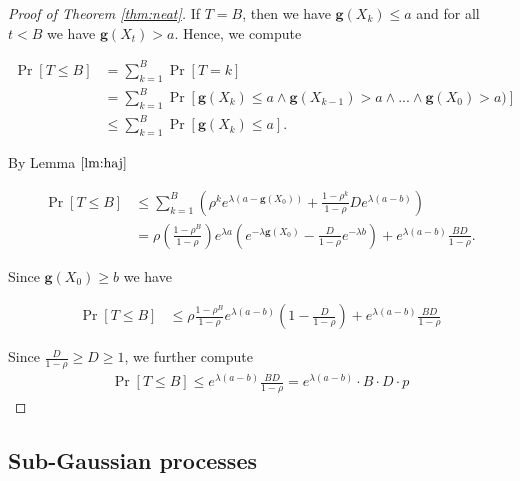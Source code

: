 \documentclass[12pt, a4paper]{article}
\newcommand{\gfun}{\mathbf{g}}
\theoremstyle{remark}
\theoremstyle{definition}
\begin{document}
\begin{proof}[Proof of Theorem \ref{thm:neat}]

    If $T = B$, then we have $\gfun(X_k) \leq a$ and for all $t < B$ we have $\gfun(X_t) > a$. Hence, we compute

    \begin{align*}
        \Pr[T \leq B] & = \sum_{k=1}^{B} \Pr[T = k]                                                                        \\
                      & = \sum_{k=1}^{B} \Pr[\gfun(X_k) \leq a \land \gfun(X_{k - 1}) > a \land ... \land \gfun(X_0) > a)] \\
                      & \leq \sum_{k=1}^{B} \Pr[\gfun(X_k) \leq a].
    \end{align*}

    By Lemma $\ref{lm:haj}$

    \begin{align*}
        \Pr[T \leq B] & \leq \sum_{k=1}^{B} \left(\rho^k e^{\lambda(a - \gfun(X_0))} + \frac{1 - \rho^k}{1 - \rho} D e^{\lambda(a - b)}\right)                                                          \\
                      & = \rho \left(\frac{1 - \rho^B}{1 - \rho}\right) e^{\lambda a}\left(e^{-\lambda\gfun(X_0)} - \frac{D}{1 - \rho} e^{-\lambda b}\right) + e^{\lambda(a - b)} \frac{B D}{1 - \rho}.
    \end{align*}

    Since $\gfun(X_0) \ge b$ we have

    \begin{align*}
        \Pr[T \leq B] & \leq \rho \frac{1 - \rho^B}{1 - \rho} e^{\lambda (a - b)}\left(1 - \frac{D}{1 - \rho}\right) + e^{\lambda(a - b)} \frac{B D}{1 - \rho}
    \end{align*}

    Since $\frac{D}{1 - \rho} \geq D \geq 1 $, we further compute
    \begin{align*}
        \Pr[T \leq B] \leq e^{\lambda(a - b)} \frac{B D}{1 - \rho} = e^{\lambda(a - b)} \cdot B \cdot D \cdot p
    \end{align*}

\end{proof}
\subsection{Sub-Gaussian processes}
\end{document}
